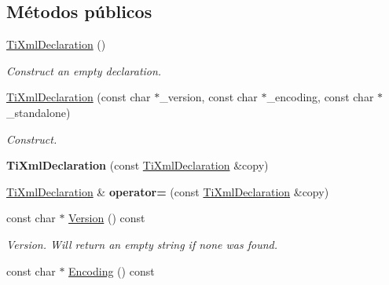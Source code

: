 \subsection*{\-Métodos públicos}
\begin{DoxyCompactItemize}
\item 
\hypertarget{classTiXmlDeclaration_aa0484d059bea0ea1acb47c9094382d79}{\hyperlink{classTiXmlDeclaration_aa0484d059bea0ea1acb47c9094382d79}{\-Ti\-Xml\-Declaration} ()}\label{classTiXmlDeclaration_aa0484d059bea0ea1acb47c9094382d79}

\begin{DoxyCompactList}\small\item\em \-Construct an empty declaration. \end{DoxyCompactList}\item 
\hypertarget{classTiXmlDeclaration_a3b618d1c30c25e4b7a71f31a595ee298}{\hyperlink{classTiXmlDeclaration_a3b618d1c30c25e4b7a71f31a595ee298}{\-Ti\-Xml\-Declaration} (const char $\ast$\-\_\-version, const char $\ast$\-\_\-encoding, const char $\ast$\-\_\-standalone)}\label{classTiXmlDeclaration_a3b618d1c30c25e4b7a71f31a595ee298}

\begin{DoxyCompactList}\small\item\em \-Construct. \end{DoxyCompactList}\item 
\hypertarget{classTiXmlDeclaration_a58ac9042c342f7845c8491da0bb091e8}{{\bfseries \-Ti\-Xml\-Declaration} (const \hyperlink{classTiXmlDeclaration}{\-Ti\-Xml\-Declaration} \&copy)}\label{classTiXmlDeclaration_a58ac9042c342f7845c8491da0bb091e8}

\item 
\hypertarget{classTiXmlDeclaration_a3bc617efe11014ff2b1a9c5727c37a9a}{\hyperlink{classTiXmlDeclaration}{\-Ti\-Xml\-Declaration} \& {\bfseries operator=} (const \hyperlink{classTiXmlDeclaration}{\-Ti\-Xml\-Declaration} \&copy)}\label{classTiXmlDeclaration_a3bc617efe11014ff2b1a9c5727c37a9a}

\item 
\hypertarget{classTiXmlDeclaration_a02ee557b1a4545c3219ed377c103ec76}{const char $\ast$ \hyperlink{classTiXmlDeclaration_a02ee557b1a4545c3219ed377c103ec76}{\-Version} () const }\label{classTiXmlDeclaration_a02ee557b1a4545c3219ed377c103ec76}

\begin{DoxyCompactList}\small\item\em \-Version. \-Will return an empty string if none was found. \end{DoxyCompactList}\item 
\hypertarget{classTiXmlDeclaration_a5d974231f9e9a2f0542f15f3a46cdb76}{const char $\ast$ \hyperlink{classTiXmlDeclaration_a5d974231f9e9a2f0542f15f3a46cdb76}{\-Encoding} () const }\label{classTiXmlDeclaration_a5d974231f9e9a2f0542f15f3a46cdb76}


\end{DoxyCompactItemize}
